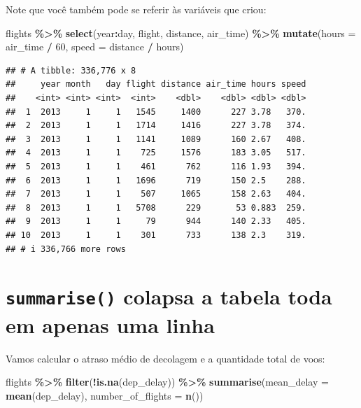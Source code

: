 \documentclass[
]{book}
\newenvironment{Shaded}{\begin{snugshade}}{\end{snugshade}}
\newcommand{\AttributeTok}[1]{\textcolor[rgb]{0.13,0.29,0.53}{#1}}
\newcommand{\DecValTok}[1]{\textcolor[rgb]{0.00,0.00,0.81}{#1}}
\newcommand{\FunctionTok}[1]{\textcolor[rgb]{0.13,0.29,0.53}{\textbf{#1}}}
\newcommand{\NormalTok}[1]{#1}
\newcommand{\SpecialCharTok}[1]{\textcolor[rgb]{0.81,0.36,0.00}{\textbf{#1}}}
\begin{document}
Note que você também pode se referir às variáveis que criou:

\begin{Shaded}
\begin{Highlighting}[]
\NormalTok{flights }\SpecialCharTok{\%\textgreater{}\%}
    \FunctionTok{select}\NormalTok{(year}\SpecialCharTok{:}\NormalTok{day, flight,  distance, air\_time) }\SpecialCharTok{\%\textgreater{}\%}
    \FunctionTok{mutate}\NormalTok{(}\AttributeTok{hours =}\NormalTok{ air\_time }\SpecialCharTok{/} \DecValTok{60}\NormalTok{,}
           \AttributeTok{speed =}\NormalTok{ distance }\SpecialCharTok{/}\NormalTok{ hours)}
\end{Highlighting}
\end{Shaded}

\begin{verbatim}
## # A tibble: 336,776 x 8
##     year month   day flight distance air_time hours speed
##    <int> <int> <int>  <int>    <dbl>    <dbl> <dbl> <dbl>
##  1  2013     1     1   1545     1400      227 3.78   370.
##  2  2013     1     1   1714     1416      227 3.78   374.
##  3  2013     1     1   1141     1089      160 2.67   408.
##  4  2013     1     1    725     1576      183 3.05   517.
##  5  2013     1     1    461      762      116 1.93   394.
##  6  2013     1     1   1696      719      150 2.5    288.
##  7  2013     1     1    507     1065      158 2.63   404.
##  8  2013     1     1   5708      229       53 0.883  259.
##  9  2013     1     1     79      944      140 2.33   405.
## 10  2013     1     1    301      733      138 2.3    319.
## # i 336,766 more rows
\end{verbatim}

\section{\texorpdfstring{\texttt{summarise()} colapsa a tabela toda em apenas uma linha}{summarise() colapsa a tabela toda em apenas uma linha}}\label{summarise-colapsa-a-tabela-toda-em-apenas-uma-linha}

Vamos calcular o atraso médio de decolagem e a quantidade total de voos:

\begin{Shaded}
\begin{Highlighting}[]
\NormalTok{flights }\SpecialCharTok{\%\textgreater{}\%}
    \FunctionTok{filter}\NormalTok{(}\SpecialCharTok{!}\FunctionTok{is.na}\NormalTok{(dep\_delay)) }\SpecialCharTok{\%\textgreater{}\%}
    \FunctionTok{summarise}\NormalTok{(}\AttributeTok{mean\_delay =} \FunctionTok{mean}\NormalTok{(dep\_delay), }\AttributeTok{number\_of\_flights =} \FunctionTok{n}\NormalTok{())}
\end{Highlighting}
\end{Shaded}
\end{document}

